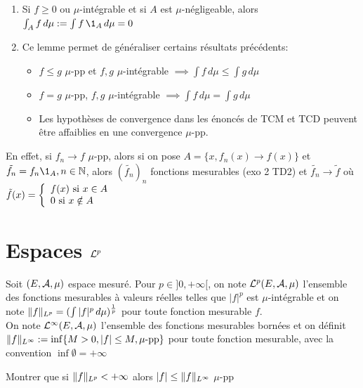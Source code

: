 \documentclass[]{report}
\begin{document}
    \begin{re}{}{}
        \begin{enumerate}
            \item Si $f\ge 0$ ou $\mu$-intégrable et si $A$ est $\mu$-négligeable, alors $\int_A f\,d\mu:=\int f\, \1_A\,d\mu=0$
            \item Ce lemme permet de généraliser certains résultats précédents:\begin{itemize}
                \item $f\le g$ $\mu$-pp et $f,g$ $\mu$-intégrable $\implies \int f\,d\mu\le \int g\,d\mu$
                \item $f=g$ $\mu$-pp, $f,g$ $\mu$-intégrable $\implies \int f\,d\mu=\int g\,d\mu$
                \item Les hypothèses de convergence dans les énoncés de TCM et TCD peuvent être affaiblies en une convergence $\mu$-pp.
            \end{itemize}
        \end{enumerate}
        En effet, si $f_n\to f$ $\mu$-pp, alors si  on pose $A=\{x,f_n(x)\to f(x)\}$ et $\tilde{f_n}=f_n \1_A,n\in \N$, alors $(\tilde{f_n})_n$ fonctions mesurables (exo 2 TD2) et $\tilde{f_n}\to \tilde{f}$ où $\tilde{f}(x)=\left\{\begin{array}{ll} f(x)\text{ si $x\in A$}\\0\text{ si $x\notin A$} \end{array} \right.$
    \end{re}

    \section{Espaces $\mathcal{L}^p$}
    
    \begin{df}{}{}
        Soit $(E,\mathcal{A},\mu)$ espace mesuré. Pour $p\in ]0,+\infty[$, on note $\mathcal{L}^p(E,\mathcal{A},\mu)$ l'ensemble des fonctions mesurables à valeurs réelles telles que $|f|^p$ est $\mu$-intégrable et on note $\lVert f \rVert_{L^p}=(\int |f|^p\,d\mu)^{\frac{1}{p}}$ pour toute fonction mesurable $f$.\\
        On note $\mathcal{L}^{\infty}(E,\mathcal{A},\mu)$ l'ensemble des fonctions mesurables bornées et on définit $\lVert f \rVert_{L^{\infty}}:=\inf\{M>0,|f|\le M,\mu\text{-pp}\}$ pour toute fonction mesurable, avec la convention $\inf \emptyset=+\infty$
    \end{df}

    \begin{exo}{}{}
        Montrer que si $\lVert f \rVert_{L^p}<+\infty$ alors $|f|\le \lVert f \rVert_{L^\infty}$ $\mu$-pp
    \end{exo}
\end{document}
